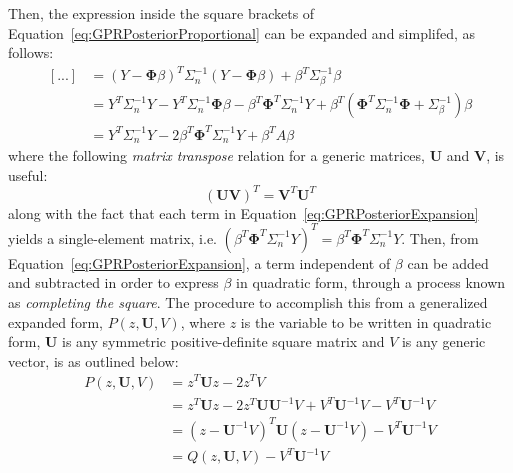 \documentclass{article}
\begin{document}
Then, the expression inside the square brackets of Equation~\eqref{eq:GPRPosteriorProportional} can be expanded and simplifed, as follows:
\begin{equation}
\label{eq:GPRPosteriorExpansion}
	\begin{aligned}
	\left[...\right] &= \left(Y - \mathbf{\Phi} \beta\right)^T \Sigma_n^{-1} \left(Y - \mathbf{\Phi} \beta\right) + \beta^T \Sigma_\beta^{-1} \beta \\
	&= Y^T \Sigma_n^{-1} Y - Y^T \Sigma_n^{-1} \mathbf{\Phi} \beta - \beta^T \mathbf{\Phi}^T \Sigma_n^{-1} Y + \beta^T \left(\mathbf{\Phi}^T \Sigma_n^{-1} \mathbf{\Phi} + \Sigma_\beta^{-1}\right) \beta \\
	&= Y^T \Sigma_n^{-1} Y - 2 \beta^T \mathbf{\Phi}^T \Sigma_n^{-1} Y + \beta^T A \beta
	\end{aligned}
\end{equation}
where the following \emph{matrix transpose} relation for a generic matrices, $\mathbf{U}$ and $\mathbf{V}$, is useful:
\begin{equation}
\label{eq:MatrixTransposeRelation}
	\left(\mathbf{U} \mathbf{V}\right)^T = \mathbf{V}^T \mathbf{U}^T
\end{equation}
along with the fact that each term in Equation~\eqref{eq:GPRPosteriorExpansion} yields a single-element matrix, i.e. $\left(\beta^T \mathbf{\Phi}^T \Sigma_n^{-1} Y\right)^T = \beta^T \mathbf{\Phi}^T \Sigma_n^{-1} Y$. Then, from Equation~\eqref{eq:GPRPosteriorExpansion}, a term independent of $\beta$ can be added and subtracted in order to express $\beta$ in quadratic form, through a process known as \emph{completing the square}. The procedure to accomplish this from a generalized expanded form, $P\!\left(z,\mathbf{U},V\right)$, where $z$ is the variable to be written in quadratic form, $\mathbf{U}$ is any symmetric positive-definite square matrix and $V$ is any generic vector, is as outlined below:
\begin{equation}
\label{eq:GeneralizedSquareCompletion}
	\begin{aligned}
	P\!\left(z,\mathbf{U},V\right) &= z^T \mathbf{U} z - 2 z^T V \\
	&= z^T \mathbf{U} z - 2 z^T \mathbf{U} \mathbf{U}^{-1} V + V^T \mathbf{U}^{-1} V - V^T \mathbf{U}^{-1} V \\
	&= \left(z - \mathbf{U}^{-1} V\right)^T \mathbf{U} \left(z - \mathbf{U}^{-1} V\right) - V^T \mathbf{U}^{-1} V \\
	&= Q\!\left(z,\mathbf{U},V\right) - V^T \mathbf{U}^{-1} V
	\end{aligned}
\end{equation}
\end{document}
